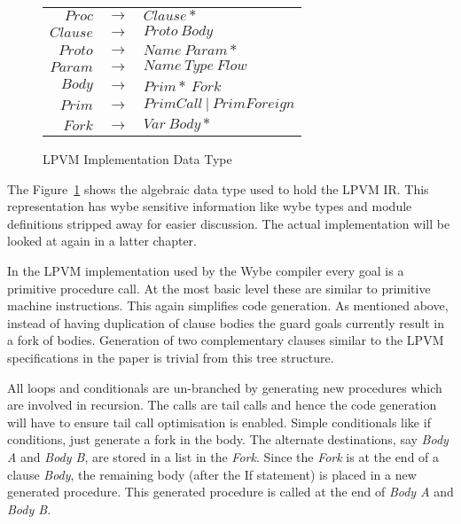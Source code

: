 \begin{figure}
\centering
\begin{tabular}{r c l}
\( Proc \)   & \( \rightarrow \) & \( Clause* \) \\
\( Clause \) & \( \rightarrow \) & \( Proto\ Body \) \\
\( Proto \)  & \( \rightarrow \) & \( Name\ Param* \) \\
\( Param \)  & \( \rightarrow \) & \( Name\ Type\ Flow \) \\
\( Body \)   & \( \rightarrow \) & \( Prim*\ Fork \) \\
\( Prim \)   & \( \rightarrow \) & \( PrimCall\ |\ PrimForeign \) \\
\( Fork \)   & \( \rightarrow \) & \( Var\ Body* \) \\
\end{tabular}
\caption{LPVM Implementation Data Type}
\label{fig:lpvm_data_type}
\end{figure}

The Figure~\ref{fig:lpvm_data_type} shows the algebraic data type used to hold
the LPVM IR. This representation has wybe sensitive information like wybe types
and module definitions stripped away for easier discussion. The actual
implementation will be looked at again in a latter chapter.


In the LPVM implementation used by the Wybe compiler every goal is a primitive
procedure call. At the most basic level these are similar to primitive machine
instructions. This again simplifies code generation. As mentioned above,
instead of having duplication of clause bodies the guard goals currently result
in a fork of bodies. Generation of two complementary clauses similar to the
LPVM specifications in the paper is trivial from this tree structure.


All loops and conditionals are un-branched by generating new procedures which
are involved in recursion. The calls are tail calls and hence the code
generation will have to ensure tail call optimisation is enabled. Simple
conditionals like if conditions, just generate a fork in the body. The
alternate destinations, say \textit{Body A} and \textit{Body B}, are stored in a
list in the \textit{Fork}. Since the \textit{Fork} is at the end of a clause
\textit{Body}, the remaining body (after the If statement) is placed in a new
generated procedure. This generated procedure is called at the end of
\textit{Body A} and \textit{Body B}.

